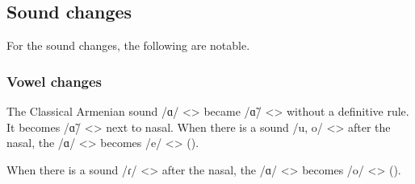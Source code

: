 \subsection{Sound changes}

For the sound changes, the following are notable. 


\subsubsection{Vowel changes}


The Classical Armenian sound /ɑ/ <> became /ɑ̃/ <> without a definitive rule. It becomes /ɑ̃/ <> next to nasal. When there is a sound /u, o/ <> after the nasal, the /ɑ/ <> becomes /e/ <> (). 




\begin{table}[H]
	\centering 
	\caption{Change from Classical Armenian /ɑ/ <> to /e/ <> in the Nicomedia dialect}
	\label{tab:Nicomedia:phonology:change:a:an}
\end{table}



When there is a sound /ɾ/ <> after the nasal, the /ɑ/ <> becomes /o/ <> (). 




